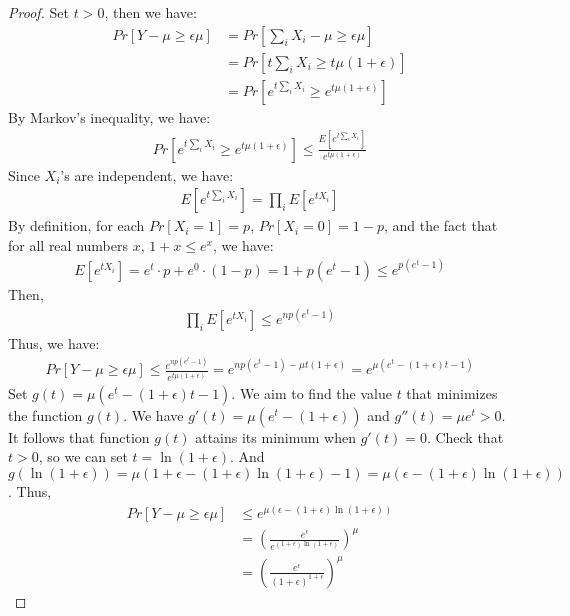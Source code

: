 \begin{proof}
Set $t>0$, then we have:
\begin{align}
    \nonumber Pr[Y-\mu \ge \epsilon \mu] &=Pr[\sum_{i}X_i-\mu \ge \epsilon \mu]\\
    \nonumber &=Pr[t\sum_{i}X_i \ge t\mu(1+\epsilon)]\\
    \nonumber &=Pr[e^{t\sum_{i}X_i } \ge e^{t\mu(1+\epsilon)}]
\end{align}
By Markov's inequality, we have:
\begin{align}
    \nonumber Pr[e^{t\sum_{i}X_i } \ge e^{t\mu(1+\epsilon)}] \le \frac{E[e^{t\sum_{i}X_i }]}{e^{t\mu(1+\epsilon)}}
\end{align}
Since $X_i$'s are independent, we have:
\begin{align}
    \nonumber E[e^{t\sum_{i}X_i }]=\prod_{i}E[e^{tX_i}]
\end{align}
By definition, for each $Pr[X_i=1]=p$, $Pr[X_i=0]=1-p$, and the fact that for all real numbers $x$, $1+x\le e^x$, we have:
\begin{align}
    \nonumber E[e^{tX_i}]=e^t\cdot p+e^0 \cdot (1-p)=1+p(e^t-1) \le e^{p(e^t-1)}
\end{align}
Then,
\begin{align}
    \nonumber \prod_{i}E[e^{tX_i}]\le e^{np(e^t-1)}
\end{align}
Thus, we have:
\begin{align}
    \nonumber Pr[Y-\mu \ge \epsilon \mu] \le \frac{e^{np(e^t-1)}}{e^{t\mu(1+\epsilon)}}=e^{np(e^t-1)-\mu t(1+\epsilon)}=e^{\mu(e^t-(1+\epsilon)t-1)}
\end{align}
Set $g(t)=\mu(e^t-(1+\epsilon)t-1)$. We aim to find the value $t$ that minimizes the function $g(t)$.
We have $g'(t)=\mu(e^t-(1+\epsilon))$ and $g''(t)=\mu e^t >0$. It follows that function $g(t)$ attains its minimum when $g'(t) = 0$.
Check that $t>0$, so we can set $t=\ln{(1+\epsilon)}$.
And $g(\ln{(1+\epsilon)})=\mu(1+\epsilon-(1+\epsilon)\ln{(1+\epsilon)}-1)=\mu(\epsilon-(1+\epsilon)\ln(1+\epsilon))$.
Thus,
\begin{align}
    \nonumber Pr[Y-\mu \ge \epsilon \mu] &\le e^{\mu(\epsilon-(1+\epsilon)\ln(1+\epsilon))}\\
    \nonumber &=(\frac{e^\epsilon}{e^{(1+\epsilon)\ln(1+\epsilon)}})^{\mu}\\
    \nonumber &=(\frac{e^\epsilon}{(1+\epsilon)^{1+\epsilon}})^{\mu}
\end{align}
\end{proof}
\noindent {}\\
